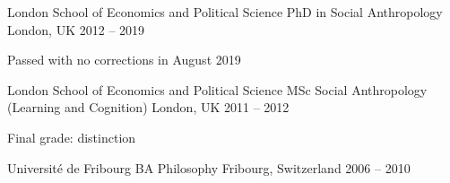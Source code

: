 

\begin{cventries}

  \cventry
    {London School of Economics and Political Science} %
    {PhD in Social Anthropology} %
    {London, UK} %
    {2012 -- 2019} %
    {
      \begin{cvitems} %
        \item {Passed with no corrections in August 2019}
      \end{cvitems}
    }

  \cventry
    {London School of Economics and Political Science} %
    {MSc Social Anthropology (Learning and Cognition)} %
    {London, UK} %
    {2011 -- 2012} %
    {
      \begin{cvitems} %
        \item {Final grade: distinction}
      \end{cvitems}
    }

  \cventry
    {Université de Fribourg} %
    {BA Philosophy} %
    {Fribourg, Switzerland} %
    {2006 -- 2010} %
    {}

\end{cventries}
